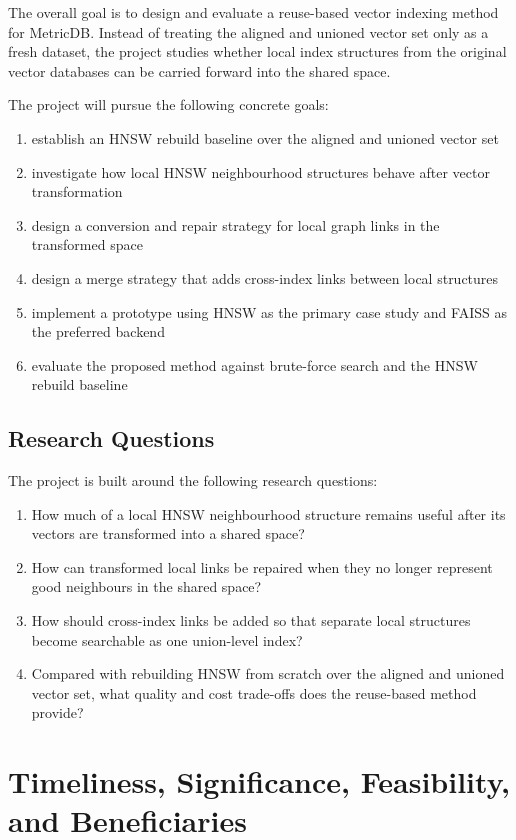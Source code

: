 \documentclass[11pt]{article}
\begin{document}
The overall goal is to design and evaluate a reuse-based vector indexing method for MetricDB. Instead of treating the aligned and unioned vector set only as a fresh dataset, the project studies whether local index structures from the original vector databases can be carried forward into the shared space.

The project will pursue the following concrete goals:

\begin{enumerate}
\item establish an HNSW rebuild baseline over the aligned and unioned vector set
\item investigate how local HNSW neighbourhood structures behave after vector transformation
\item design a conversion and repair strategy for local graph links in the transformed space
\item design a merge strategy that adds cross-index links between local structures
\item implement a prototype using HNSW as the primary case study and FAISS as the preferred backend
\item evaluate the proposed method against brute-force search and the HNSW rebuild baseline
\end{enumerate}

\subsection{Research Questions}

The project is built around the following research questions:

\begin{enumerate}
\item How much of a local HNSW neighbourhood structure remains useful after its vectors are transformed into a shared space?
\item How can transformed local links be repaired when they no longer represent good neighbours in the shared space?
\item How should cross-index links be added so that separate local structures become searchable as one union-level index?
\item Compared with rebuilding HNSW from scratch over the aligned and unioned vector set, what quality and cost trade-offs does the reuse-based method provide?
\end{enumerate}

\section{Timeliness, Significance, Feasibility, and Beneficiaries}
\end{document}
